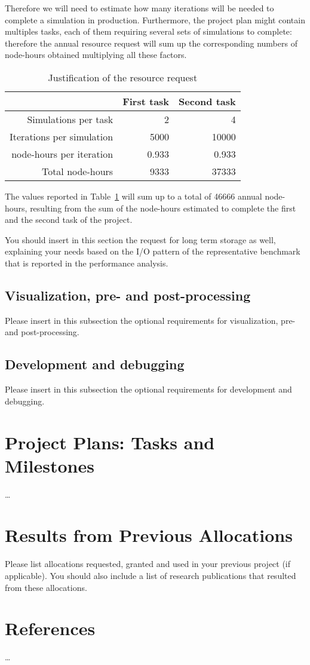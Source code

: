 \documentclass[11pt]{article}
\begin{document}
Therefore we will need to estimate how many iterations will be needed to complete a simulation in production. 
Furthermore, the project plan might contain multiples tasks, each of them requiring several sets of simulations to complete:
therefore the annual resource request will sum up the corresponding numbers of node-hours obtained multiplying all these factors. 
\begin{table}[H]
 \begin{center}
  \begin{tabular}{@{}*3{r}@{}}
   \hline \hline
   & First task & Second task \\ 
   \hline \hline
   Simulations per task & 2 & 4 \\
   Iterations per simulation & 5000 & 10000 \\
   node-hours per iteration & 0.933 & 0.933 \\
   Total node-hours & 9333 & 37333 \\
   \hline \hline
  \end{tabular}
 \end{center}
 \caption{Justification of the resource request}
 \label{table:resource_request}
\end{table}
The values reported in Table~\ref{table:resource_request} will sum up to a total of 46666 annual node-hours, resulting from the 
sum of the node-hours estimated to complete the first and the second task of the project.

You should insert in this section the request for long term storage as well, explaining your needs 
based on the I/O pattern of the representative benchmark that is reported in the performance analysis. 
 
\subsection{Visualization, pre- and post-processing}
Please insert in this subsection the optional requirements for visualization, pre- and post-processing.

\subsection{Development and debugging}
Please insert in this subsection the optional requirements for development and debugging. 

\section{Project Plans: Tasks and Milestones}
\ldots

\section{Results from Previous Allocations}
Please list allocations requested, granted and used in your previous project (if applicable). 
You should also include a list of research publications that resulted from these allocations.

\section*{References}
\ldots


\end{document}
